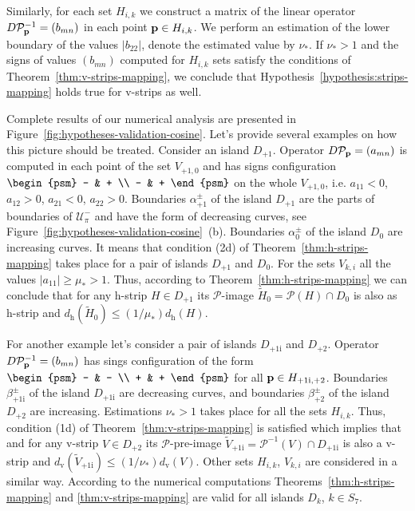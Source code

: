 Similarly, for each set $H_{i, k}$ we construct a matrix of the linear operator $D \mathcal{P}^{-1}_{\vb{p}} = (b_{mn})$ in each point $\vb{p} \in H_{i, k}$.
We perform an estimation of the lower boundary of the values $|b_{22}|$, denote the estimated value by $\nu_*$.
If $\nu_* > 1$ and the signs of values $(b_{mn})$ computed for $H_{i, k}$ sets satisfy the conditions of Theorem~\ref{thm:v-strips-mapping}, we conclude that Hypothesis~\ref{hypothesis:strips-mapping} holds true for v-strips as well.

Complete results of our numerical analysis are presented in Figure~\ref{fig:hypotheses-validation-cosine}.
Let's provide several examples on how this picture should be treated.
Consider an island $D_{+1}$.
Operator $D \mathcal{P}_{\vb{p}} = (a_{mn})$ is computed in each point of the set $V_{+1, 0}$ and has signs configuration $\begin{psm} - & + \\ - & + \end{psm}$ on the whole $V_{+1, 0}$, i.e. $a_{11} < 0$, $a_{12} > 0$, $a_{21} < 0$, $a_{22} > 0$.
Boundaries $\alpha_{+1}^{\pm}$ of the island $D_{+1}$ are the parts of boundaries of $\mathscr{U}_{\pi}^-$ and have the form of decreasing curves, see Figure~\ref{fig:hypotheses-validation-cosine}~(b).
Boundaries $\alpha_0^{\pm}$ of the island $D_0$ are increasing curves.
It means that condition (2d) of Theorem~\ref{thm:h-strips-mapping} takes place for a pair of islands $D_{+1}$ and $D_0$.
For the sets $V_{k, i}$ all the values $|a_{11}| \ge \mu_* > 1$.
Thus, according to Theorem~\ref{thm:h-strips-mapping} we can conclude that for any h-strip $H \in D_{+1}$ its $\mathcal{P}$-image $\widetilde{H}_0 = \mathcal{P}(H) \cap D_0$ is also as h-strip and $d_{\mathrm{h}}(\widetilde{H}_0) \le (1 / \mu_*) d_\mathrm{h}(H)$.

For another example let's consider a pair of islands $D_{+1 \mathrm{i}}$ and $D_{+2}$.
Operator $D \mathcal{P}^{-1}_{\vb{p}} = (b_{mn})$ has sings configuration of the form $\begin{psm} - & - \\ + & + \end{psm}$ for all $\vb{p} \in H_{+1 \mathrm{i}, +2}$.
Boundaries $\beta_{+1 \mathrm{i}}^{\pm}$ of the island $D_{+1 \mathrm{i}}$ are decreasing curves, and boundaries $\beta_{+2}^{\pm}$ of the island $D_{+2}$ are increasing.
Estimations $\nu_* > 1$ takes place for all the sets $H_{i, k}$.
Thus, condition (1d) of Theorem~\ref{thm:v-strips-mapping} is satisfied which implies that and for any v-strip $V \in D_{+2}$ its $\mathcal{P}$-pre-image $\widetilde{V}_{+1 \mathrm{i}} = \mathcal{P}^{-1}(V) \cap D_{+1\mathrm{i}}$ is also a v-strip and $d_{\mathrm{v}}(\widetilde{V}_{+1 \mathrm{i}}) \le (1 / \nu_*) d_\mathrm{v}(V)$.
Other sets $H_{i, k}$, $V_{k, i}$ are considered in a similar way.
According to the numerical computations Theorems~\ref{thm:h-strips-mapping} and \ref{thm:v-strips-mapping} are valid for all islands $D_k$, $k \in S_7$.

